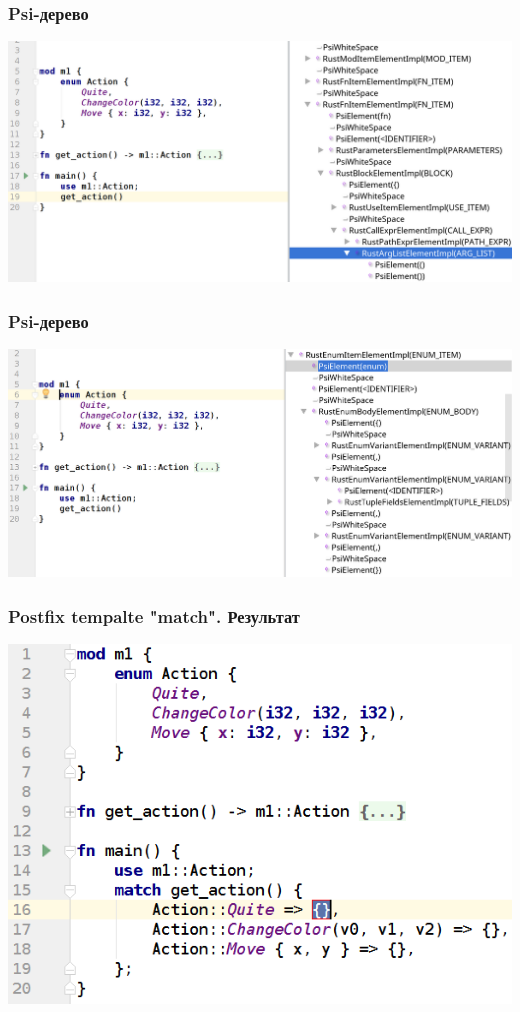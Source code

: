 \documentclass[10pt,pdf,hyperref={unicode}]{beamer}
\begin{document}
\begin{frame}
    \frametitle{Psi-дерево} 
	\includegraphics[scale = 0.3]{psi1.png}
\end{frame}

\begin{frame}
	\frametitle{Psi-дерево} 
	\includegraphics[scale = 0.3]{psi2.png}
\end{frame}

\begin{frame}
	\frametitle{Postfix tempalte "match". Результат} 
	\includegraphics[scale = 0.6]{match_after.png}
\end{frame}
\end{document}
